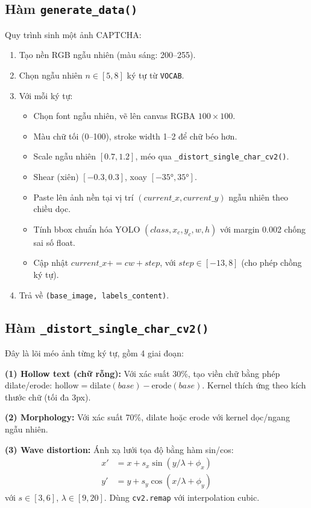 \documentclass[a4paper,12pt]{report}
\begin{document}
\subsection{Hàm \texttt{generate\_data()}}
Quy trình sinh một ảnh CAPTCHA:

\begin{enumerate}[leftmargin=*]
  \item Tạo nền RGB ngẫu nhiên (màu sáng: 200--255).
  \item Chọn ngẫu nhiên $n \in [5, 8]$ ký tự từ \texttt{VOCAB}.
  \item Với mỗi ký tự:
  \begin{itemize}
    \item Chọn font ngẫu nhiên, vẽ lên canvas RGBA $100 \times 100$.
    \item Màu chữ tối (0--100), stroke width 1--2 để chữ béo hơn.
    \item Scale ngẫu nhiên $[0.7, 1.2]$, méo qua \texttt{\_distort\_single\_char\_cv2()}.
    \item Shear (xiên) $[-0.3, 0.3]$, xoay $[-35°, 35°]$.
    \item Paste lên ảnh nền tại vị trí $(current\_x, current\_y)$ ngẫu nhiên theo chiều dọc.
    \item Tính bbox chuẩn hóa YOLO $(class, x_c, y_c, w, h)$ với margin 0.002 chống sai số float.
    \item Cập nhật $current\_x += cw + step$, với $step \in [-13, 8]$ (cho phép chồng ký tự).
  \end{itemize}
  \item Trả về \texttt{(base\_image, labels\_content)}.
\end{enumerate}

\subsection{Hàm \texttt{\_distort\_single\_char\_cv2()}}
Đây là lõi méo ảnh từng ký tự, gồm 4 giai đoạn:

\textbf{(1) Hollow text (chữ rỗng):} Với xác suất 30\%, tạo viền chữ bằng phép dilate/erode: $\text{hollow} = \text{dilate}(base) - \text{erode}(base)$. Kernel thích ứng theo kích thước chữ (tối đa 3px).

\textbf{(2) Morphology:} Với xác suất 70\%, dilate hoặc erode với kernel dọc/ngang ngẫu nhiên.

\textbf{(3) Wave distortion:} Ánh xạ lưới tọa độ bằng hàm sin/cos:
\begin{align}
x' &= x + s_x \sin(y/\lambda + \phi_x) \\
y' &= y + s_y \cos(x/\lambda + \phi_y)
\end{align}
với $s \in [3, 6]$, $\lambda \in [9, 20]$. Dùng \texttt{cv2.remap} với interpolation cubic.
\end{document}
